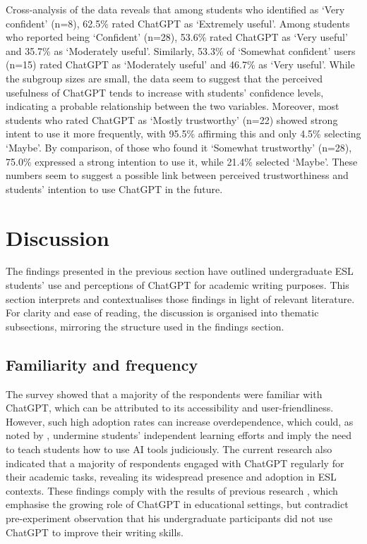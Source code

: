 \documentclass[english]{textolivre}
\begin{document}
Cross-analysis of the data reveals that among students who identified as ‘Very confident’ (n=8), 62.5\% rated ChatGPT as ‘Extremely useful’. Among students who reported being ‘Confident’ (n=28), 53.6\% rated ChatGPT as ‘Very useful’ and 35.7\% as ‘Moderately useful’. Similarly, 53.3\% of ‘Somewhat confident’ users (n=15) rated ChatGPT as ‘Moderately useful’ and 46.7\% as ‘Very useful’. While the subgroup sizes are small, the data seem to suggest that the perceived usefulness of ChatGPT tends to increase with students’ confidence levels, indicating a probable relationship between the two variables. Moreover, most students who rated ChatGPT as ‘Mostly trustworthy’ (n=22) showed strong intent to use it more frequently, with 95.5\% affirming this and only 4.5\% selecting ‘Maybe’. By comparison, of those who found it ‘Somewhat trustworthy’ (n=28), 75.0\% expressed a strong intention to use it, while 21.4\% selected ‘Maybe’. These numbers seem to suggest a possible link between perceived trustworthiness and students’ intention to use ChatGPT in the future.

\section{Discussion}
The findings presented in the previous section have outlined undergraduate ESL students’ use and perceptions of ChatGPT for academic writing purposes. This section interprets and contextualises those findings in light of relevant literature. For clarity and ease of reading, the discussion is organised into thematic subsections, mirroring the structure used in the findings section.

\subsection{Familiarity and frequency}
The survey showed that a majority of the respondents were familiar with ChatGPT, which can be attributed to its accessibility and user-friendliness. However, such high adoption rates can increase overdependence, which could, as noted by \textcite{mogavi2024}, undermine students’ independent learning efforts and imply the need to teach students how to use AI tools judiciously. The current research also indicated that a majority of respondents engaged with ChatGPT regularly for their academic tasks, revealing its widespread presence and adoption in ESL contexts. These findings comply with the results of previous research \cite{crcek2023, klimova2024, punar2024}, which emphasise the growing role of ChatGPT in educational settings, but contradict \textcite{mahapatra2024} pre-experiment observation that his undergraduate participants did not use ChatGPT to improve their writing skills.
\end{document}
